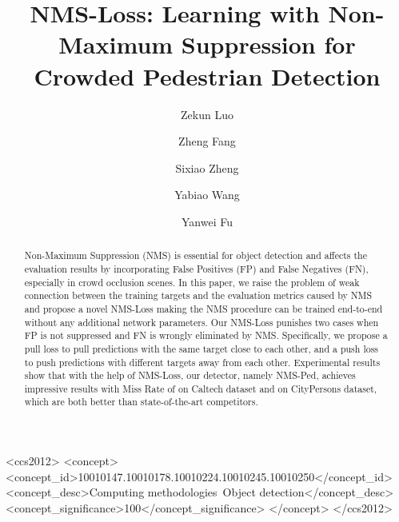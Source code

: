 \documentclass[sigconf]{acmart}
\begin{document}
\fancyhead{}

\title{NMS-Loss: Learning with Non-Maximum Suppression for Crowded Pedestrian Detection}

\author{Zekun Luo}

\author{Zheng Fang}

\author{Sixiao Zheng}

\author{Yabiao Wang}

\author{Yanwei Fu}

\begin{abstract}

Non-Maximum Suppression (NMS) is essential for object detection and affects the evaluation results by incorporating False Positives (FP) and False Negatives (FN), especially in crowd occlusion scenes. In this paper, we raise the problem of weak connection between the training targets and the evaluation metrics caused by NMS and propose a novel NMS-Loss making the NMS procedure can be trained end-to-end without any additional network parameters. Our NMS-Loss punishes two cases when FP is not suppressed and FN is wrongly eliminated by NMS. Specifically, we propose a pull loss to pull predictions with the same target close to each other, and a push loss to push predictions with different targets away from each other. Experimental results show that with the help of NMS-Loss, our detector, namely NMS-Ped, achieves impressive results with Miss Rate of  on Caltech dataset and  on CityPersons dataset, which are both better than state-of-the-art competitors.

\end{abstract}

\begin{CCSXML}
<ccs2012>
<concept>
<concept_id>10010147.10010178.10010224.10010245.10010250</concept_id>
<concept_desc>Computing methodologies~Object detection</concept_desc>
<concept_significance>100</concept_significance>
</concept>
</ccs2012>
\end{CCSXML}
\end{document}
